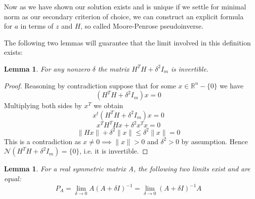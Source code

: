 \documentclass[a4paper]{article}
\theoremstyle{break}
\newtheorem{lemma}[theorem]{Lemma}
\newcommand{\R}{\mathbb{R}}
\newcommand{\Nu}{\mathcal{N}}
\begin{document}
Now as we have shown our solution exists and is unique if we settle for minimal norm as our secondary criterion of choice, we can construct an explicit formula for $a$ in terms of $z$ and $H$, so called Moore-Penrose pseudoinverse.


The following two lemmas will guarantee that the limit involved in this definition exists:

\begin{lemma}\label{lem:invertible_1}
    For any nonzero $\delta$ the matrix $H^T H + \delta^2  I_m$ is invertible.
    \label{thm:invertible}
\end{lemma}
\begin{proof}
    Reasoning by contradiction suppose that for some $x \in \R^n - \{0\}$ we have
    $$ (H^T H + \delta^2  I_m) x = 0 $$ %
Multiplying both sides by $x^T$ we obtain
    $$ x^t (H^T H + \delta^2  I_m) x = 0 $$ %
    $$ x^T H^T H x + \delta^2 x^T x = 0 $$
    $$ \| H x \| + \delta^2 \| x \| \leq \delta^2 \| x \| = 0 $$
This is a contradiction as $ x \neq 0 \implies \| x \| > 0 $ and $ \delta^2 > 0$ by assumption.
Hence $\Nu(H^T H + \delta^2  I_m) = \{0\} $, i.e. it is invertible.
\end{proof}

\begin{lemma}\label{lem:limit_existence_1}
    For a real symmetric matrix A, the following two limits exist and are equal:
    \begin{equation}
        P_A = \lim_{\delta \to 0} A ( A + \delta I) ^{-1}
            = \lim_{\delta \to 0} ( A + \delta I) ^{-1} A
    \end{equation}
\end{lemma}
\end{document}
